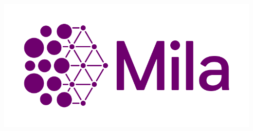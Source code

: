 \documentclass{beamer}
\begin{document}
\begin{frame}
\begin{itemize}
\begin{center}
                \includegraphics[scale=0.4]{../figures/mila.png}
            \end{center}
        \end{itemize}
    \end{frame}
\end{document}
